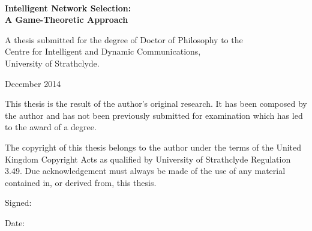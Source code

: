 \begin{titlepage}

\vspace*{2.2cm}

\\[1ex]
{\bf\sffamily\Huge Intelligent Network Selection:}\\[1ex]
{\bf\sffamily\Huge A Game-Theoretic Approach}

\par
\vspace{2cm}


\par
\vspace{6.5cm}

\noindent A thesis submitted for the degree of Doctor of Philosophy to the \\Centre for Intelligent and Dynamic Communications,\\ University of Strathclyde.

\par
\vspace{1cm}

\noindent December 2014

\cleardoublepage


\vspace*{2.2cm}

\noindent This thesis is the result of the author's original research. It has been composed by the author and has not been previously submitted for examination which has led to the award of a degree.

\par
\vspace{1em}

\noindent The copyright of this thesis belongs to the author under the terms of the United Kingdom Copyright Acts as qualified by University of Strathclyde Regulation 3.49. Due acknowledgement must always be made of the use of any material contained in, or derived from, this thesis.

\par
\vspace{1em}

\noindent Signed:

\par
\vspace{1em}

\noindent Date:

\cleardoublepage
\end{titlepage}